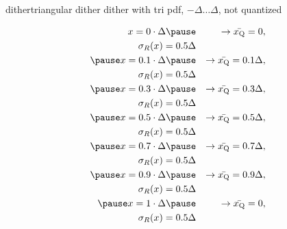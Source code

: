 	\begin{frame}{dither}{triangular dither}
        \vspace{-3mm}
        dither with tri pdf, $-{\Delta}\ldots {\Delta}$, not quantized
        \begin{footnotesize}
        \begin{eqnarray*}
               x = 0 \cdot \Delta \pause &&\rightarrow \bar{x_\mathrm{Q}} =0,\\ 
            \sigma_R(x) = 0.5\Delta&&\\ 
            \pause
            \smallskip
               x = 0.1 \cdot \Delta \pause &&\rightarrow \bar{x_\mathrm{Q}} = 0.1\Delta ,\\ 
            \sigma_R(x) = 0.5\Delta&&\\ 
            \pause
            \smallskip
               x = 0.3 \cdot \Delta \pause &&\rightarrow \bar{x_\mathrm{Q}} = 0.3\Delta ,\\ 
            \sigma_R(x) = 0.5\Delta&&\\ 
            \pause
            \smallskip
               x = 0.5 \cdot \Delta \pause &&\rightarrow \bar{x_\mathrm{Q}} = 0.5\Delta ,\\ 
            \sigma_R(x) = 0.5\Delta&&\\ 
            \pause
            \smallskip
               x = 0.7 \cdot \Delta \pause &&\rightarrow \bar{x_\mathrm{Q}} = 0.7\Delta ,\\ 
            \sigma_R(x) = 0.5\Delta&&\\ 
            \pause
            \smallskip
               x = 0.9 \cdot \Delta \pause &&\rightarrow \bar{x_\mathrm{Q}} = 0.9\Delta ,\\ 
            \sigma_R(x) = 0.5\Delta&&\\ 
            \pause
            \smallskip
               x = 1 \cdot \Delta \pause &&\rightarrow \bar{x_\mathrm{Q}} =0,\\
            \sigma_R(x) = 0.5\Delta&&
        \end{eqnarray*}
        \end{footnotesize}
	\end{frame}	
